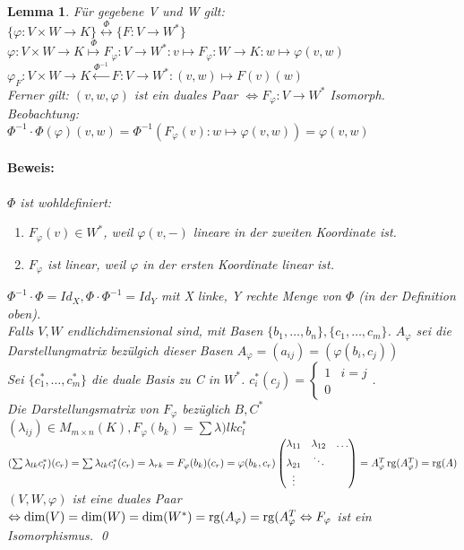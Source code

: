\documentclass{report}
\newcommand{\lb}{\lambda}
\DeclareMathOperator{\rg}{rg}
\theoremstyle{customrem}
\theoremstyle{customdef}
\newtheorem{lemma}[definition]{Lemma}
\renewenvironment{proof}{\paragraph{Beweis: }}{\qed}
\theoremstyle{customenv}
\begin{document}
\begin{lemma}
  F\"ur gegebene V und W gilt:\\
  \(\{\varphi : V \times W \to K\} \overset{\Phi}{\leftrightarrow} \{F : V \to W^*\}\)\\
  \(\varphi : V \times W \to K \overset{\Phi}{\mapsto} F_{\varphi} : V \to W^* : v \mapsto F_{\varphi}:
  W \to K : w \mapsto \varphi(v, w)\)\\
  \(\varphi_F : V \times W \to K \overset{\Phi^{-1}}\leftarrow F : V \to W^* :
  (v, w) \mapsto F(v)(w)\)\\
  Ferner gilt: \((v, w, \varphi)\) ist ein duales Paar \(\Leftrightarrow F_{\varphi}
  : V \to W^*\) Isomorph.\\
  Beobachtung:\\
  \(\Phi^{-1} \cdot \Phi(\varphi)(v, w)
  = \Phi^{-1}(F_{\varphi}(v) : w \mapsto \varphi(v, w)) = \varphi(v, w)\)
  \begin{proof}
    \(\Phi\) ist wohldefiniert:\\
    \begin{enumerate}
      \item{
       \(F_{\varphi}(v) \in W^*\), weil \(\varphi(v, -)\) lineare in der zweiten
        Koordinate ist.
      }
      \item{
        \(F_{\varphi}\) ist linear, weil \(\varphi\) in der ersten Koordinate 
       linear ist.
      }
    \end{enumerate}
    \(\Phi^{-1} \cdot \Phi = Id_X, \Phi \cdot \Phi^{-1} = Id_Y\) mit X linke,
    Y rechte Menge von \(\Phi\) (in der Definition oben).\\
    Falls \(V, W\) endlichdimensional sind, mit Basen \(\{b_1, \dots, b_n\},
    \{c_1, \dots, c_m\}\). \(A_{\varphi}\) sei die Darstellungmatrix
    bez\"ulgich dieser Basen \(A_{\varphi} = (a_{ij}) = (\varphi(b_i, c_j))\)\\
    Sei \(\{c_1^*, \dots, c_m^*\}\) die duale Basis zu C in \(W^*\).
    \(c_i^*(c_j) = \begin{cases}1 & i = j\\ 0\end{cases}\).\\
    Die Darstellungsmatrix von \(F_{\varphi}\) bez\"uglich \(B, C^*\)
    \((\lb_{ij}) \in M_{m \times n}(K), F_{\varphi}(b_k) = \sum \lb){lk}c_l^* \)
    \((\sum \lb_{lk}c_l^*)(c_r) = \sum \lb_{lk}c_l^*(c_r) = \lb_{rk}
    = F_{\varphi}(b_k)(c_r) = \varphi(b_k, c_r)\\
    \begin{pmatrix}
      \lb_{11} & \lb_{12} & \dots\\
      \lb_{21} & \ddots\\
      \vdots
    \end{pmatrix} = A_{\varphi}^T\\
    \rg(A_{\varphi}^T) = \rg(A)
    \)\\
    \((V, W, \varphi)\) ist eine duales Paar
    \(\Leftrightarrow \dim(V) = \dim(W) = \dim(W^*) = \rg(A_{\varphi})
    = \rg(A_{\varphi}^T\\
    \Leftrightarrow F_{\varphi}\) ist ein Isomorphismus.
  \end{proof}
\end{lemma}
\end{document}
